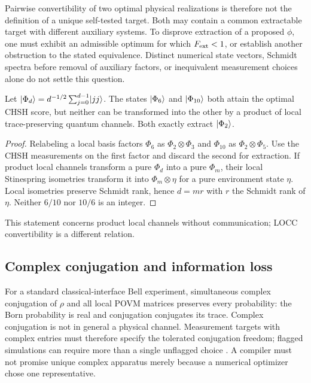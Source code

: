 Pairwise convertibility of two optimal physical realizations is therefore
not the definition of a unique self-tested target. Both may contain a common
extractable target with different auxiliary systems. To disprove extraction
of a proposed $\phi$, one must exhibit an admissible optimum for which
$F_{\rm ext}<1$, or establish another obstruction to the stated equivalence.
Distinct numerical state vectors, Schmidt spectra before removal of auxiliary
factors, or inequivalent measurement choices alone do not settle this question.

\begin{proposition}
Let $\lvert \Phi_d\rangle=d^{-1/2}\sum_{j=0}^{d-1}\lvert jj\rangle$. The states
$\lvert \Phi_6\rangle$ and $\lvert \Phi_{10}\rangle$ both attain the optimal CHSH score, but
neither can be transformed into the other by a product of local trace-preserving
quantum channels. Both exactly extract $\lvert \Phi_2\rangle$.
\end{proposition}
\begin{proof}
Relabeling a local basis factors $\Phi_6$ as $\Phi_2\otimes\Phi_3$ and
$\Phi_{10}$ as $\Phi_2\otimes\Phi_5$. Use the CHSH measurements on the first
factor and discard the second for extraction. If product local channels
transform a pure $\Phi_d$ into a pure $\Phi_m$, their local Stinespring
isometries transform it into $\Phi_m\otimes\eta$ for a pure environment state
$\eta$. Local isometries preserve Schmidt rank, hence $d=mr$ with
$r$ the Schmidt rank of $\eta$. Neither $6/10$ nor $10/6$ is an integer.
\end{proof}
This statement concerns product local channels without communication;
LOCC convertibility is a different relation.

\subsection{Complex conjugation and information loss}
For a standard classical-interface Bell experiment, simultaneous complex
conjugation of $\rho$ and all local POVM matrices preserves every probability:
the Born probability is real and conjugation conjugates its trace. Complex
conjugation is not in general a physical channel. Measurement targets with
complex entries must therefore specify the tolerated conjugation freedom;
flagged simulations can require more than a single unflagged choice
\cite{mckague2010}. A compiler must not promise unique complex apparatus
merely because a numerical optimizer chose one representative.


